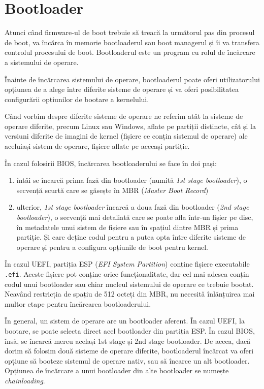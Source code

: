 \section{Bootloader}
\label{sec:boot:bootloader}

Atunci când firmware-ul de boot trebuie să treacă la următorul pas din procesul
de boot, va încărca în memorie bootloaderul sau boot managerul și îi va
transfera controlul procesului de boot. Bootloaderul este un program cu rolul
de încărcare a sistemului de operare.

Înainte de încărcarea sistemului de operare, bootloaderul poate oferi
utilizatorului opțiunea de a alege între diferite sisteme de operare și va oferi
posibilitatea configurării opțiunilor de bootare a kernelului.

Când vorbim despre diferite sisteme de operare ne referim atât la sisteme de operare
diferite, precum Linux sau Windows, aflate pe partiții distincte, cât și la
versiuni diferite de imagini de kernel (fișiere ce conțin sistemul de operare)
ale aceluiași sistem de operare, fișiere aflate pe aceeași partiție.

În cazul folosirii BIOS, încărcarea bootloaderului se face în doi pași:

\begin{enumerate}
  \item întâi se încarcă prima fază din bootloader (numită \textit{1st stage bootloader}), o secvență scurtă care se găsește în MBR (\textit{Master
    Boot Record})
  \item ulterior, \textit{1st stage bootloader} încarcă a doua fază din bootloader
    (\textit{2nd stage bootloader}), o secvență mai detaliată care se poate afla
    într-un fișier pe disc, în metadatele unui sistem de fișiere sau în spațiul dintre MBR și prima partiție.
    Și care deține codul pentru a putea opta
    între diferite sisteme de operare și pentru a configura
    opțiunile de boot pentru kernel.
\end{enumerate}

În cazul UEFI, partiția ESP (\textit{EFI System Partition}) conține fișiere executabile
\texttt{.efi}. Aceste fișiere pot conține orice funcționalitate, dar cel mai adesea conțin
codul unui bootloader sau chiar nucleul sistemului de operare ce trebuie bootat.
Neavând restricția de spațiu de 512 octeți din MBR, nu necesită înlănțuirea mai multor
etape pentru încărcarea bootloaderului.

În general, un sistem de operare are un bootloader aferent. În cazul UEFI, la
bootare, se poate selecta direct acel bootloader din partiția ESP. În cazul BIOS,
însă, se încarcă mereu același 1st stage și 2nd stage bootloader. De aceea, dacă
dorim să folosim două sisteme de operare diferite, bootloaderul încărcat va
oferi opțiune să booteze sistemul de operare nativ, sau să încarce un alt
bootloader. Opțiunea de încărcare a unui bootloader din alte bootloader se
numește \textit{chainloading}.

